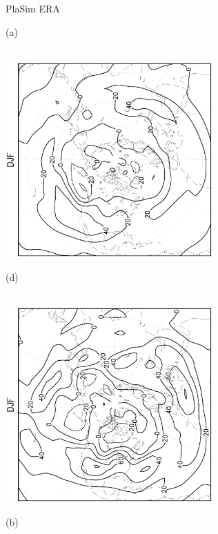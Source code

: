 \documentclass[12pt,a4paper,twoside,openright,headinclude,liststotoc,bibtotoc]{scrreprt}
\begin{document}
\begin{figure}[c]
\hspace{3.5cm}PlaSim \vspace{0.2cm} \hspace{7.3cm} ERA \\
\parbox{8.5cm}{\hspace{0.90cm}\begin{scriptsize}(a)\end{scriptsize} \vspace{-0.5cm} \\
\includegraphics[height=7.5cm,angle=-90]
{eps/PLDJF300fluxes_tr.eps}
}
\parbox{8.5cm}{\hspace{0.95cm}\begin{scriptsize}(d)\end{scriptsize} \vspace{-0.5cm} \\
\includegraphics[height=7.5cm,angle=-90]
{eps/ERADJF300fluxes_tr.eps}
}
\parbox{8.5cm}{\hspace{0.90cm}\begin{scriptsize}(b)\end{scriptsize} \vspace{-0.2cm} \\
}
\end{figure}
\end{document}
